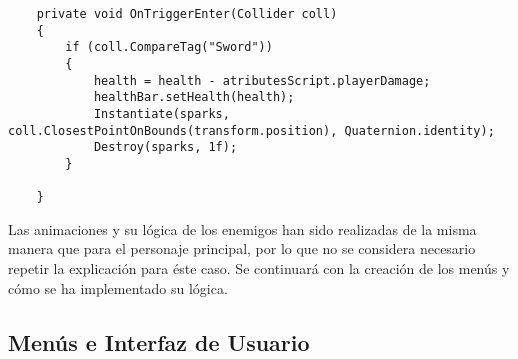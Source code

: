 \begin{lstlisting}
    private void OnTriggerEnter(Collider coll)
    {
        if (coll.CompareTag("Sword"))
        {
            health = health - atributesScript.playerDamage;
            healthBar.setHealth(health);
            Instantiate(sparks, coll.ClosestPointOnBounds(transform.position), Quaternion.identity);
            Destroy(sparks, 1f);
        }

    }
\end{lstlisting}

Las animaciones y su lógica de los enemigos han sido realizadas de la misma manera que para el personaje principal, por lo que no se considera necesario repetir la explicación para éste caso. Se continuará con la creación de los menús y cómo se ha implementado su lógica.

\subsection{Menús e Interfaz de Usuario}
